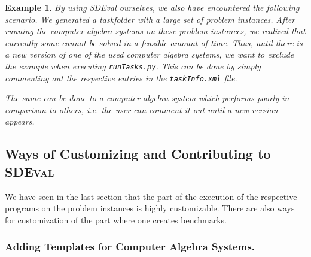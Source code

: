\documentclass[oribibl,11pt]{article}
\newtheorem{example}{Example}
\begin{document}
\vspace*{-10pt}
\begin{example}
By using SDEval ourselves, we also have encountered the following
scenario. We generated a taskfolder with a large set of
problem instances. After running the computer algebra systems on these
problem instances, we realized that currently some cannot be solved in a
feasible amount of time. Thus, until there is a new version of one of the used computer
algebra systems, we want to exclude the example when executing
\texttt{runTasks.py}. This can be done by simply commenting out the
respective entries in the \texttt{taskInfo.xml} file.

The same can be done to a computer algebra system which performs
poorly in comparison to others,
i.e. the user can comment it out until a new version appears.
\end{example}
\vspace*{-10pt}
\subsection{Ways of Customizing and Contributing to \textsc{SDEval}}

We have seen in the last section that the part of the execution of the
respective programs on the problem instances is highly
customizable. There are also ways for customization of the part where
one creates benchmarks.


\subsubsection{Adding Templates for Computer Algebra Systems.}
\end{document}

